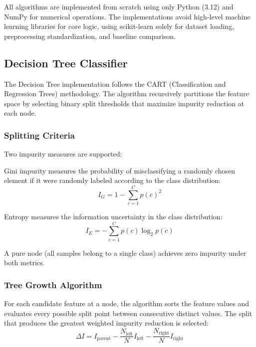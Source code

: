 \documentclass[conference,12pt]{IEEEtran}
\begin{document}
All algorithms are implemented from scratch using only Python (3.12) and NumPy for numerical operations. The implementations avoid high-level machine learning libraries for core logic, using scikit-learn solely for dataset loading, preprocessing standardization, and baseline comparison.

\subsection{Decision Tree Classifier}

The Decision Tree implementation follows the CART (Classification and Regression Trees) methodology. The algorithm recursively partitions the feature space by selecting binary split thresholds that maximize impurity reduction at each node.

\subsubsection{Splitting Criteria}

Two impurity measures are supported:

Gini impurity measures the probability of misclassifying a randomly chosen element if it were randomly labeled according to the class distribution:
\begin{equation}
I_G = 1 - \sum_{c=1}^{C} p(c)^2
\end{equation}

Entropy measures the information uncertainty in the class distribution:
\begin{equation}
I_E = -\sum_{c=1}^{C} p(c) \log_2 p(c)
\end{equation}

A pure node (all samples belong to a single class) achieves zero impurity under both metrics.

\subsubsection{Tree Growth Algorithm}

For each candidate feature at a node, the algorithm sorts the feature values and evaluates every possible split point between consecutive distinct values. The split that produces the greatest weighted impurity reduction is selected:
\begin{equation}
\Delta I = I_{\text{parent}} - \frac{N_{\text{left}}}{N} I_{\text{left}} - \frac{N_{\text{right}}}{N} I_{\text{right}}
\end{equation}
\end{document}
